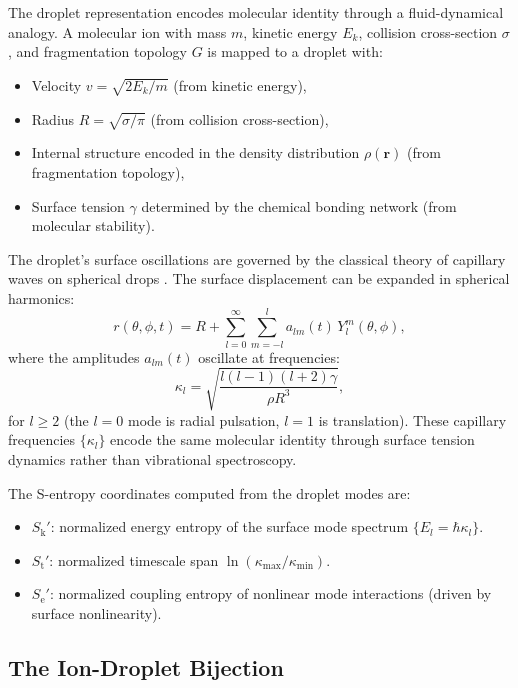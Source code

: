 \documentclass[11pt,twocolumn,a4paper]{article}
\theoremstyle{definition}
\theoremstyle{remark}
\newcommand{\Sk}{S_{\mathrm{k}}}
\newcommand{\St}{S_{\mathrm{t}}}
\newcommand{\Se}{S_{\mathrm{e}}}
\begin{document}
The droplet representation encodes molecular identity through a fluid-dynamical analogy. A molecular ion with mass $m$, kinetic energy $E_k$, collision cross-section $\sigma$, and fragmentation topology $G$ is mapped to a droplet with:
\begin{itemize}
  \item Velocity $v = \sqrt{2E_k / m}$ (from kinetic energy),
  \item Radius $R = \sqrt{\sigma / \pi}$ (from collision cross-section),
  \item Internal structure encoded in the density distribution $\rho(\mathbf{r})$ (from fragmentation topology),
  \item Surface tension $\gamma$ determined by the chemical bonding network (from molecular stability).
\end{itemize}

The droplet's surface oscillations are governed by the classical theory of capillary waves on spherical drops \citep{rayleigh1879,lamb1881,chandrasekhar1961}. The surface displacement can be expanded in spherical harmonics:
\begin{equation}\label{eq:surface-modes}
  r(\theta, \phi, t) = R + \sum_{l=0}^{\infty} \sum_{m=-l}^{l} a_{lm}(t)\, Y_l^m(\theta, \phi),
\end{equation}
where the amplitudes $a_{lm}(t)$ oscillate at frequencies:
\begin{equation}\label{eq:rayleigh-freq}
  \kappa_l = \sqrt{\frac{l(l-1)(l+2)\gamma}{\rho R^3}},
\end{equation}
for $l \geq 2$ (the $l = 0$ mode is radial pulsation, $l = 1$ is translation). These capillary frequencies $\{\kappa_l\}$ encode the same molecular identity through surface tension dynamics rather than vibrational spectroscopy.

The S-entropy coordinates computed from the droplet modes are:
\begin{itemize}
  \item $\Sk'$: normalized energy entropy of the surface mode spectrum $\{E_l = \hbar \kappa_l\}$.
  \item $\St'$: normalized timescale span $\ln(\kappa_{\max}/\kappa_{\min})$.
  \item $\Se'$: normalized coupling entropy of nonlinear mode interactions (driven by surface nonlinearity).
\end{itemize}

\subsection{The Ion-Droplet Bijection}\label{sec:bijection}
\end{document}
